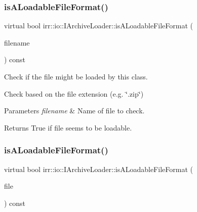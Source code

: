 \subsubsection{\texorpdfstring{is\+A\+Loadable\+File\+Format()}{isALoadableFileFormat()}\hspace{0.1cm}{\footnotesize\ttfamily [2/6]}}
{\footnotesize\ttfamily virtual bool irr\+::io\+::\+I\+Archive\+Loader\+::is\+A\+Loadable\+File\+Format (\begin{DoxyParamCaption}\item[{const \hyperlink{namespaceirr_1_1io_a6468281622ce3a1c46b72e19f32dded5}{path} \&}]{filename }\end{DoxyParamCaption}) const\hspace{0.3cm}{\ttfamily [pure virtual]}}



Check if the file might be loaded by this class. 

Check based on the file extension (e.\+g. \char`\"{}.\+zip\char`\"{}) 
\begin{DoxyParams}{Parameters}
{\em filename} & Name of file to check. \\
\hline
\end{DoxyParams}
\begin{DoxyReturn}{Returns}
True if file seems to be loadable. 
\end{DoxyReturn}
\mbox{\label{classirr_1_1io_1_1IArchiveLoader_acda22c3c2a5268665a4a4cf17379931b}} 
\subsubsection{\texorpdfstring{is\+A\+Loadable\+File\+Format()}{isALoadableFileFormat()}\hspace{0.1cm}{\footnotesize\ttfamily [3/6]}}
{\footnotesize\ttfamily virtual bool irr\+::io\+::\+I\+Archive\+Loader\+::is\+A\+Loadable\+File\+Format (\begin{DoxyParamCaption}\item[{\hyperlink{classirr_1_1io_1_1IReadFile}{io\+::\+I\+Read\+File} $\ast$}]{file }\end{DoxyParamCaption}) const\hspace{0.3cm}{\ttfamily [pure virtual]}}



